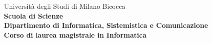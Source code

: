 \begin{titlepage}
  \center %


  \begingroup
  \noindent
  \begin{minipage}[t]{0.16\textwidth}
  \end{minipage}%
  \hfill
  \begin{minipage}[t]{0.8\textwidth}\raggedright
    {\large Università degli Studi di Milano Bicocca} \\
    {\small\textbf{Scuola di Scienze} \\
    \textbf{Dipartimento di Informatica, Sistemistica e Comunicazione} \\
    \textbf{Corso di laurea magistrale in Informatica} \\
    }
  \end{minipage}%
  \par\endgroup



\end{titlepage}
